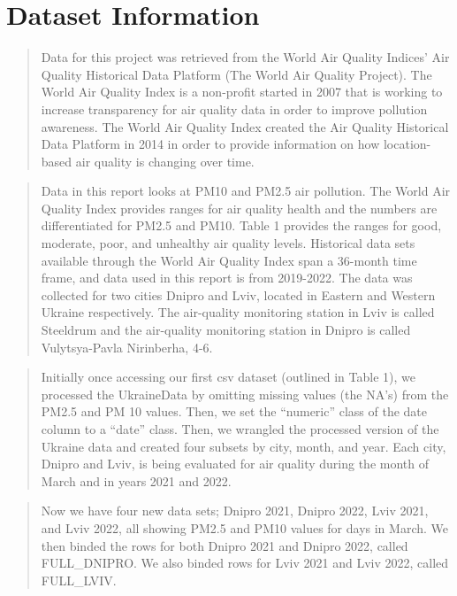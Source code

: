 \documentclass[
  12pt,
]{article}
\begin{document}
\newpage

\hypertarget{dataset-information}{%
\section{Dataset Information}\label{dataset-information}}

\begin{quote}
Data for this project was retrieved from the World Air Quality Indices'
Air Quality Historical Data Platform (The World Air Quality Project).
The World Air Quality Index is a non-profit started in 2007 that is
working to increase transparency for air quality data in order to
improve pollution awareness. The World Air Quality Index created the Air
Quality Historical Data Platform in 2014 in order to provide information
on how location-based air quality is changing over time.
\end{quote}

\begin{quote}
Data in this report looks at PM10 and PM2.5 air pollution. The World Air
Quality Index provides ranges for air quality health and the numbers are
differentiated for PM2.5 and PM10. Table 1 provides the ranges for good,
moderate, poor, and unhealthy air quality levels. Historical data sets
available through the World Air Quality Index span a 36-month time
frame, and data used in this report is from 2019-2022. The data was
collected for two cities Dnipro and Lviv, located in Eastern and Western
Ukraine respectively. The air-quality monitoring station in Lviv is
called Steeldrum and the air-quality monitoring station in Dnipro is
called Vulytsya-Pavla Nirinberha, 4-6.
\end{quote}

\begin{quote}
Initially once accessing our first csv dataset (outlined in Table 1), we
processed the UkraineData by omitting missing values (the NA's) from the
PM2.5 and PM 10 values. Then, we set the ``numeric'' class of the date
column to a ``date'' class. Then, we wrangled the processed version of
the Ukraine data and created four subsets by city, month, and year. Each
city, Dnipro and Lviv, is being evaluated for air quality during the
month of March and in years 2021 and 2022.
\end{quote}

\begin{quote}
Now we have four new data sets; Dnipro 2021, Dnipro 2022, Lviv 2021, and
Lviv 2022, all showing PM2.5 and PM10 values for days in March. We then
binded the rows for both Dnipro 2021 and Dnipro 2022, called
FULL\_DNIPRO. We also binded rows for Lviv 2021 and Lviv 2022, called
FULL\_LVIV.
\end{quote}
\end{document}
